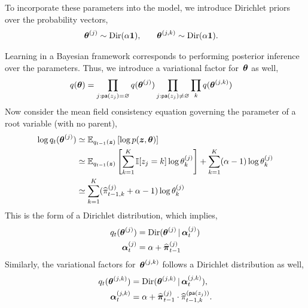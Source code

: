 To incorporate these parameters into the model, we introduce Dirichlet priors
over the probability vectors,
\begin{align}
  \boldsymbol{\theta}^{(j)} &\sim \mathrm{Dir}(\alpha \boldsymbol{1}), & & &
  \boldsymbol{\theta}^{(j,k)} &\sim \mathrm{Dir}(\alpha \boldsymbol{1}).
\end{align}

Learning in a Bayesian framework corresponds to performing posterior
inference over the parameters. Thus, we introduce a variational factor
for~$\boldsymbol{\theta}$ as well,
\begin{align}
  q(\boldsymbol{\theta}) &=
  \prod_{j: \mathsf{pa}(z_j)=\varnothing} q(\boldsymbol{\theta}^{(j)})
  \prod_{j: \mathsf{pa}(z_j)\neq \varnothing} \prod_{k} q(\boldsymbol{\theta}^{(j,k)})
\end{align}
Now consider the mean field consistency equation governing the parameter
of a root variable (with no parent),
\begin{align}
  \log q_t(\boldsymbol{\theta}^{(j)}) &\simeq
  \mathbb{E}_{q_{t-1}(\boldsymbol{z})}\left[ \log p(\boldsymbol{z}, \boldsymbol{\theta}) \right] \\
  &\simeq \mathbb{E}_{q_{t-1}(\boldsymbol{z})}
  \left[ \sum_{k=1}^K \mathbb{I}[z_j=k] \log \theta_k^{(j)} \right]
  + \sum_{k=1}^K (\alpha-1) \log \theta_k^{(j)}  \\
  &\simeq  \sum_{k=1}^K (\widehat{\pi}_{t-1,k}^{(j)} + \alpha-1) \log \theta_k^{(j)}
\end{align}
This is the form of a Dirichlet distribution, which implies,
\begin{align}
  q_t(\boldsymbol{\theta}^{(j)})
  &= \mathrm{Dir}(\boldsymbol{\theta}^{(j)} \,|\,  \boldsymbol{\alpha}_{t}^{(j)}) \\
  \boldsymbol{\alpha}_{t}^{(j)} &= \alpha + \widehat{\boldsymbol{\pi}}_{t-1}^{(j)}
\end{align}
Similarly, the variational factors for~$\boldsymbol{\theta}^{(j,k)}$
follows a Dirichlet distribution as well,
\begin{align}
  q_t(\boldsymbol{\theta}^{(j,k)}) &=
  \mathrm{Dir}(\boldsymbol{\theta}^{(j,k)} \,|\, \boldsymbol{\alpha}_{t}^{(j,k)}), \\
  \boldsymbol{\alpha}_{t}^{(j,k)} &= \alpha + \widehat{\boldsymbol{\pi}}_{t-1}^{(j)} \cdot \widehat{\pi}_{t-1,k}^{(\mathsf{pa}(z_j))}.
\end{align}

